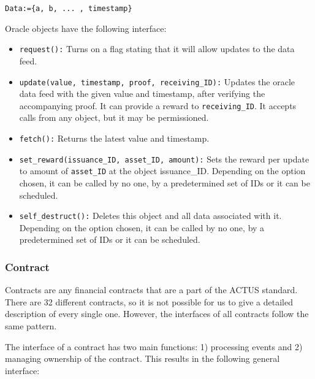 \documentclass[conference]{IEEEtran}
\begin{document}
\begin{center}
	\texttt{Data:=\{a, b, ... , timestamp\}}
\end{center}

Oracle objects have the following interface:

\begin{itemize}
	\item \texttt{request():} Turns on a flag stating that it will allow updates to the data feed.
	\item \texttt{update(value, timestamp, proof, receiving\_ID):} Updates the oracle data feed with the given value and timestamp, after verifying the accompanying proof. It can provide a reward to \texttt{receiving\_ID}. It accepts calls from any object, but it may be permissioned.
	\item \texttt{fetch():} Returns the latest value and timestamp.
	\item \texttt{set\_reward(issuance\_ID, asset\_ID, amount):} Sets the reward per update to amount of \texttt{asset\_ID} at the object issuance\_ID. Depending on the option chosen, it can be called by no one, by a predetermined set of IDs or it can be scheduled.
	\item \texttt{self\_destruct():} Deletes this object and all data associated with it. Depending on the option chosen, it can be called by no one, by a predetermined set of IDs or it can be scheduled.
\end{itemize}

\subsubsection{Contract}
Contracts are any financial contracts that are a part of the ACTUS standard. There are 32 different contracts, so it is not possible for us to give a detailed description of every single one. However, the interfaces of all contracts follow the same pattern.

The interface of a contract has two main functions: 1) processing events and 2) managing ownership of the contract. This results in the following general interface:
\end{document}

